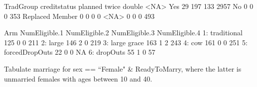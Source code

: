\begin{Schunk}
\begin{Soutput}
                 TradGroup
creditstatus      planned twice double <NA>
  Yes                  29   197    133 2957
  No                    0     0      0  353
  Replaced Member       0     0      0    0
  <NA>                  0     0      0  493
\end{Soutput}
\begin{Soutput}
              Arm NumEligible.1 NumEligible.2 NumEligible.3 NumEligible.4
1:    traditional           125             0             0           211
2:          large           146             2             0           219
3:    large grace           163             1             2           243
4:            cow           161             0             0           251
5: forcedDropOuts            22             0             0            NA
6:       dropOuts            55             1             0            57
\end{Soutput}
\end{Schunk}
Tabulate marriage for \textsf{sex} == ``Female" \& \textsf{ReadyToMarry}, where the latter is unmarried females with ages between 10 and 40.

